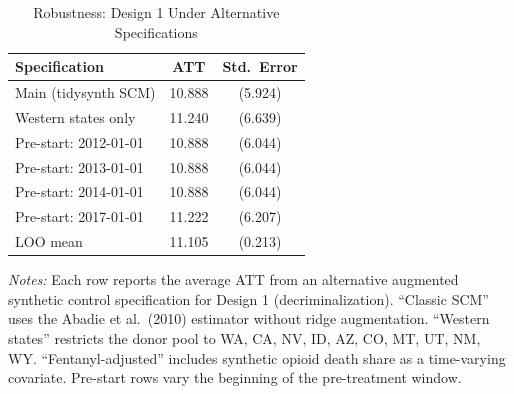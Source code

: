 \begin{table}[H]
\centering
\caption{Robustness: Design 1 Under Alternative Specifications}
\label{tab:robust}
\begin{threeparttable}
\begin{tabular}{lcc}
\toprule
Specification & ATT & Std.~Error \\
\midrule
Main (tidysynth SCM) & 10.888 & (5.924) \\
Western states only & 11.240 & (6.639) \\
Pre-start: 2012-01-01 & 10.888 & (6.044) \\
Pre-start: 2013-01-01 & 10.888 & (6.044) \\
Pre-start: 2014-01-01 & 10.888 & (6.044) \\
Pre-start: 2017-01-01 & 11.222 & (6.207) \\
LOO mean & 11.105 & (0.213) \\
\bottomrule
\end{tabular}
\begin{tablenotes}[flushleft]
\small
\item \textit{Notes:} Each row reports the average ATT from an alternative augmented synthetic control specification for Design 1 (decriminalization). ``Classic SCM'' uses the Abadie et al.\ (2010) estimator without ridge augmentation. ``Western states'' restricts the donor pool to WA, CA, NV, ID, AZ, CO, MT, UT, NM, WY. ``Fentanyl-adjusted'' includes synthetic opioid death share as a time-varying covariate. Pre-start rows vary the beginning of the pre-treatment window.
\end{tablenotes}
\end{threeparttable}
\end{table}
